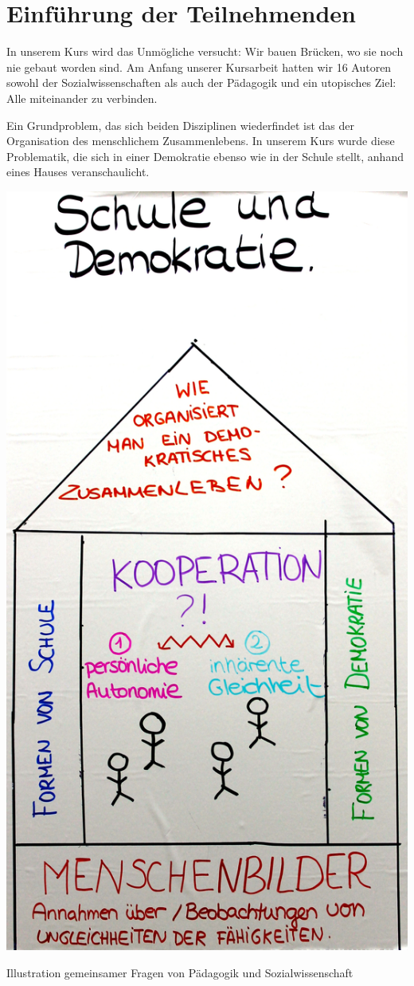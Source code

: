 \section[Einführung]{Einführung der Teilnehmenden}

In unserem Kurs wird das Unmögliche versucht:
Wir bauen Brücken, wo sie noch nie gebaut worden sind.
Am Anfang unserer Kursarbeit hatten wir 16 Autoren sowohl der Sozialwissenschaften als auch der Pädagogik und ein utopisches Ziel:
Alle miteinander zu verbinden.

Ein Grundproblem, das sich beiden Disziplinen wiederfindet ist das der Organisation des menschlichem Zusammenlebens.
In unserem Kurs wurde diese Problematik, die sich in einer Demokratie ebenso wie in der Schule stellt, anhand eines Hauses veranschaulicht.

\begin{dsafigure}
	\begin{center}
	\includegraphics[width=0.9\columnwidth]{img/Kooperationshaus.JPG}
	\caption{Illustration gemeinsamer Fragen von Pädagogik und Sozialwissenschaft}
	\label{fig:kooperationshaus}
	\end{center}
\end{dsafigure}

